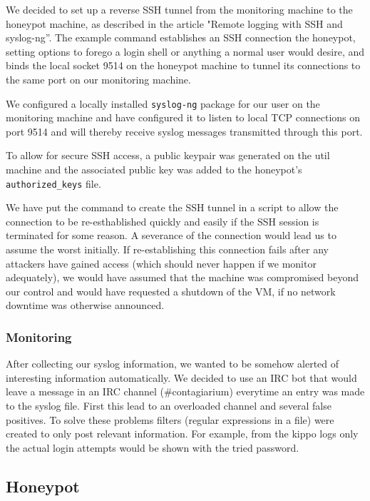\documentclass[11pt]{article}
\begin{document}
We decided to set up a reverse SSH tunnel from the monitoring machine to the honeypot machine, as described in the article "Remote logging with SSH and syslog-ng''. \cite{remote_logging}
The example command establishes an SSH connection the honeypot, setting options to forego a login shell or anything a normal user would desire, and binds the local socket 9514 on the honeypot machine to tunnel its connections to the same port on our monitoring machine.

We configured a locally installed \verb|syslog-ng| package for our user on the monitoring machine and have configured it to listen to local TCP connections on port 9514 and will thereby receive syslog messages transmitted through this port.

To allow for secure SSH access, a public keypair was generated on the util machine and the associated public key was added to the honeypot's \verb|authorized_keys| file.

We have put the command to create the SSH tunnel in a script to allow the connection to be re-esthablished quickly and easily if the SSH session is terminated for some reason. 
A severance of the connection would lead us to assume the worst initially.
If re-establishing this connection fails after any attackers have gained access (which should never happen if we monitor adequately), we would have assumed that the machine was compromised beyond our control and would have requested a shutdown of the VM, if no network downtime was otherwise announced.

\subsubsection{Monitoring}
After collecting our syslog information, we wanted to be somehow alerted of interesting information automatically.
We decided to use an IRC bot that would leave a message in an IRC channel (\#contagiarium) everytime an entry was made to the syslog file. First this lead to an overloaded channel and several false positives. To solve these problems filters (regular expressions in a file) were created to only post relevant information. For example, from the kippo logs only the actual login attempts would be shown with the tried password.


\subsection{Honeypot}
\end{document}
